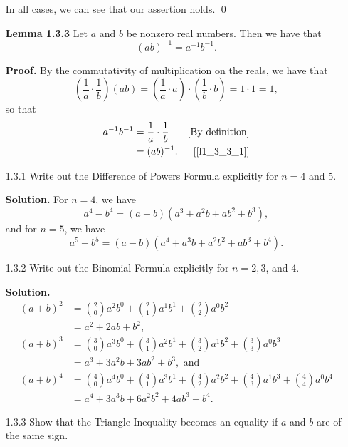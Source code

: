 \begin{enumerate}
      In all cases, we can see that our assertion holds. \qed
   \item[]        \textbf{Lemma 1.3.3} Let $a$ and $b$ be nonzero real numbers.
                  Then we have that
                  $$(ab)^{-1} = a^{-1}b^{-1}.$$

      \textbf{Proof.} By the commutativity of multiplication on the reals, we
      have that      
      \begin{equation}
         \left(\frac{1}{a} \cdot \frac{1}{b}\right)(ab) =
         \left(\frac{1}{a} \cdot a\right)\cdot \left(\frac{1}{b}
         \cdot b\right) = 1 \cdot 1 = 1, \label{l1_3_3_1}
      \end{equation}
      so that
      \begin{align*}
         a^{-1}b^{-1} &= \frac{1}{a} \cdot \frac{1}{b} &[\text{By definition}] \\
                      &= (ab)^{-1}. &[\eqref{l1_3_3_1}]
      \end{align*}
   \item[1.3.1]   Write out the Difference of Powers Formula explicitly for
                  $n = 4$ and 5.
                  
      \textbf{Solution.} For $n = 4$, we have
      $$a^4 - b^4 = (a - b)(a^3 + a^2b + ab^2 + b^3),$$
      and for $n = 5$, we have
      $$a^5 - b^5 = (a - b)(a^4 + a^3b + a^2b^2 + ab^3 + b^4).$$
   \item[1.3.2]   Write out the Binomial Formula explicitly for $n = 2, 3$, and
                  4.
                  
      \textbf{Solution.} 
      \begin{align*}
         (a + b)^2 &= \binom{2}{0}a^2b^0 + \binom{2}{1}a^1b^1 +
                      \binom{2}{2}a^0b^2 \\
                   &= a^2 + 2ab + b^2, \\
         (a + b)^3 &= \binom{3}{0}a^3b^0 + \binom{3}{1}a^2b^1 +
                      \binom{3}{2}a^1b^2 + \binom{3}{3}a^0b^3 \\
                   &= a^3 + 3a^2b + 3ab^2 + b^3, \text{ and } \\
         (a + b)^4 &= \binom{4}{0}a^4b^0 + \binom{4}{1}a^3b^1 +
                      \binom{4}{2}a^2b^2 + \binom{4}{3}a^1b^3 +
                      \binom{4}{4}a^0b^4 \\
                   &= a^4 + 3a^3b + 6a^2b^2 + 4ab^3 + b^4.
      \end{align*}
   \item[1.3.3]   Show that the Triangle Inequality becomes an equality if $a$
                  and $b$ are of the same sign.


\end{enumerate}
